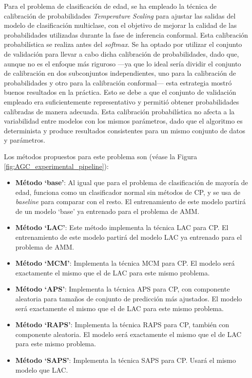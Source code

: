 Para el problema de clasificación de edad, se ha empleado la técnica de calibración de probabilidades \textit{Temperature Scaling} para ajustar las salidas del modelo de clasificación multiclase, con el objetivo de mejorar la calidad de las probabilidades utilizadas durante la fase de inferencia conformal. Esta calibración probabilística se realiza antes del \textit{softmax}. Se ha optado por utilizar el conjunto de validación para llevar a cabo dicha calibración de probabilidades, dado que, aunque no es el enfoque más riguroso ---ya que lo ideal sería dividir el conjunto de calibración en dos subconjuntos independientes, uno para la calibración de probabilidades y otro para la calibración conformal--- esta estrategia mostró buenos resultados en la práctica. Esto se debe a que el conjunto de validación empleado era suficientemente representativo y permitió obtener probabilidades calibradas de manera adecuada. Esta calibración probabilística no afecta a la variabilidad entre modelos con los mismos parámetros, dado que el algoritmo es determinista y produce resultados consistentes para un mismo conjunto de datos y parámetros. 

Los métodos propuestos para este problema son (véase la Figura \ref{fig:AGC_experimental_pipeline}):

\begin{itemize}

    \item \textbf{Método `base'}: Al igual que para el problema de clasificación de mayoría de edad, funciona como un clasificador normal sin métodos de \acrshort{CP}, y se usa de \textit{baseline} para comparar con el resto. El entrenamiento de este modelo partirá de un modelo `base' ya entrenado para el problema de AMM.

    \item \textbf{Método `LAC'}: Este método implementa la técnica LAC para \acrshort{CP}. El entrenamiento de este modelo partirá del modelo \acrshort{LAC} ya entrenado para el problema de AMM.

    \item \textbf{Método `MCM'}: Implementa la técnica \acrshort{MCM} para \acrshort{CP}. El modelo será exactamente el mismo que el de LAC para este mismo problema. 

    \item \textbf{Método `APS'}: Implementa la técnica \acrshort{APS} para \acrshort{CP}, con componente aleatoria para tamaños de conjunto de predicción más ajustados. El modelo será exactamente el mismo que el de LAC para este mismo problema.

    \item \textbf{Método `RAPS'}: Implementa la técnica \acrshort{RAPS} para \acrshort{CP}, también con componente aleatoria. El modelo será exactamente el mismo que el de LAC para este mismo problema. 
    
    \item \textbf{Método `SAPS'}: Implementa la técnica \acrshort{SAPS} para \acrshort{CP}. Usará el mismo modelo que \acrshort{LAC}. 

\end{itemize} 


